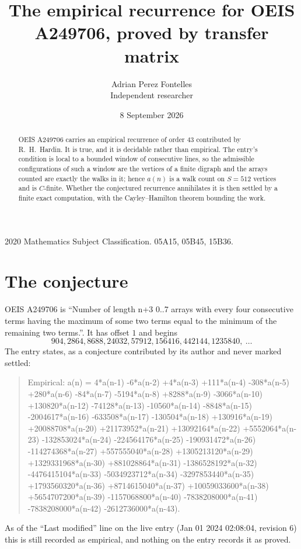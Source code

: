 \documentclass[11pt,a4paper]{article}
\title{The empirical recurrence for OEIS A249706, proved by transfer matrix}
\author{Adrian Perez Fontelles\\ \small Independent researcher}
\date{8 September 2026}
\theoremstyle{plain}
\theoremstyle{definition}
\begin{document}
\maketitle

\begin{abstract}
OEIS A249706 carries an empirical recurrence of order $43$ contributed by R.~H.~Hardin. It is
true, and it is decidable rather than empirical. The entry's condition is local to a bounded window of consecutive lines, so
the admissible configurations of such a window are the vertices of a finite digraph and the
arrays counted are exactly the walks in it; hence $a(n)$ is a walk count on $S=512$ vertices
and is $C$-finite. Whether the conjectured recurrence annihilates it is then settled by a
finite exact computation, with the Cayley--Hamilton theorem bounding the work.
\end{abstract}

\noindent\small 2020 Mathematics Subject Classification. 05A15, 05B45, 15B36.\normalsize

\section{The conjecture}

OEIS A249706 is ``Number of length n+3 0..7 arrays with every four consecutive terms having the maximum of some two terms equal to the minimum of the remaining two terms.''. It has offset $1$ and begins
\[
904, 2864, 8688, 24032, 57912, 156416, 442144, 1235840,\ \dots
\]
The entry states, as a conjecture contributed by its author and never marked settled:
\begin{quote}
Empirical: a(n) = 4*a(n-1) -6*a(n-2) +4*a(n-3) +111*a(n-4) -308*a(n-5) +280*a(n-6) -84*a(n-7) -5194*a(n-8) +8288*a(n-9) -3066*a(n-10) +130820*a(n-12) -74128*a(n-13) -10560*a(n-14) -8848*a(n-15) -2004617*a(n-16) -633508*a(n-17) -130504*a(n-18) +130916*a(n-19) +20088708*a(n-20) +21173952*a(n-21) +13092164*a(n-22) +5552064*a(n-23) -132853024*a(n-24) -224564176*a(n-25) -190931472*a(n-26) -114274368*a(n-27) +557555040*a(n-28) +1305213120*a(n-29) +1329331968*a(n-30) +881028864*a(n-31) -1386528192*a(n-32) -4476415104*a(n-33) -5034923712*a(n-34) -3297853440*a(n-35) +1793560320*a(n-36) +8714615040*a(n-37) +10059033600*a(n-38) +5654707200*a(n-39) -1157068800*a(n-40) -7838208000*a(n-41) -7838208000*a(n-42) -2612736000*a(n-43).
\end{quote}
As of the ``Last modified'' line on the live entry (Jan 01 2024 02:08:04, revision 6) this is still
recorded as empirical, and nothing on the entry records it as proved.
\end{document}
